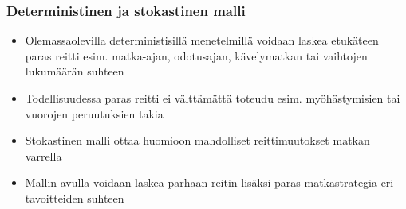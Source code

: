 \documentclass{beamer}
\begin{document}
\begin{frame}
  \frametitle{Deterministinen ja stokastinen malli} 
  \begin{itemize}
   \item 
    Olemassaolevilla deterministisillä menetelmillä voidaan laskea etukäteen paras reitti esim. matka-ajan, odotusajan, kävelymatkan tai vaihtojen lukumäärän suhteen 
    \item
    Todellisuudessa paras reitti ei välttämättä toteudu esim. myöhästymisien tai vuorojen peruutuksien takia
    \item
    Stokastinen malli ottaa huomioon mahdolliset reittimuutokset matkan varrella
    \item
    Mallin avulla voidaan laskea parhaan reitin lisäksi paras matkastrategia eri tavoitteiden suhteen
   \end{itemize}
     \begin{center}
      \end{center}
\end{frame} 
\end{document}
